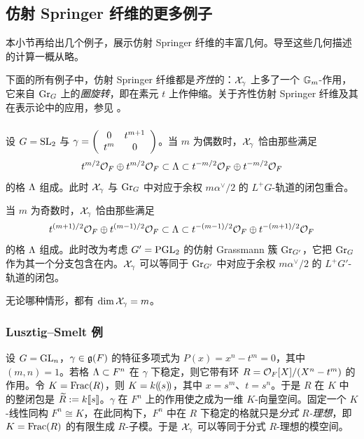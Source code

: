 \subsection{仿射 Springer 纤维的更多例子}\label{ss:aff examples}
本小节再给出几个例子，展示仿射 Springer 纤维的丰富几何。导至这些几何描述的计算一概从略。

下面的所有例子中，仿射 Springer 纤维都是{\em 齐性}的：$\mathcal{X}_{\gamma}$ 上多了一个 $\mathbb{G}_m$-作用，它来自 $\textup{Gr}_{G}$ 上的{\em 圈旋转}，即在素元 $t$ 上作伸缩。关于齐性仿射 Springer 纤维及其在表示论中的应用，参见 \cite{OY}。

\subsubsection{}\label{SL2 ram} 设 $G=\textup{SL}_{2}$ 与 $\gamma=\left(\begin{array}{cc} 0 & t^{m+1} \\ t^{m} & 0 \end{array}\right)$。当 $m$ 为偶数时，$\mathcal{X}_{\gamma}$ 恰由那些满足
\begin{equation*}
t^{m/2}\mathcal{O}_{F}\oplus t^{m/2}\mathcal{O}_{F}\subset\Lambda\subset t^{-m/2}\mathcal{O}_{F}\oplus t^{-m/2}\mathcal{O}_{F}
\end{equation*}
的格 $\Lambda$ 组成。此时 $\mathcal{X}_{\gamma}$ 与 $\textup{Gr}_{G}$ 中对应于余权 $m\alpha^{\vee}/2$ 的 $L^{+}G$-轨道的闭包重合。

当 $m$ 为奇数时，$\mathcal{X}_{\gamma}$ 恰由那些满足
\begin{equation*}
t^{(m+1)/2}\mathcal{O}_{F}\oplus t^{(m-1)/2}\mathcal{O}_{F}\subset\Lambda\subset t^{-(m-1)/2}\mathcal{O}_{F}\oplus t^{-(m+1)/2}\mathcal{O}_{F}
\end{equation*}
的格 $\Lambda$ 组成。此时改为考虑 $G'=\textup{PGL}_{2}$ 的仿射 Grassmann 簇 $\textup{Gr}_{G'}$，它把 $\textup{Gr}_{G}$ 作为其一个分支包含在内。$\mathcal{X}_{\gamma}$ 可以等同于 $\textup{Gr}_{G'}$ 中对应于余权 $m\alpha^{\vee}/2$ 的 $L^{+}G'$-轨道的闭包。

无论哪种情形，都有 $\dim\mathcal{X}_{\gamma}=m$。

\subsubsection{Lusztig--Smelt 例}\label{sss:LS} 设 $G=\textup{GL}_{n}$，$\gamma\in\mathfrak{g}(F)$ 的特征多项式为 $P(x)=x^{n}-t^{m}=0$，其中 $(m,n)=1$。若格 $\Lambda\subset F^{n}$ 在 $\gamma$ 下稳定，则它带有环 $R=\mathcal{O}_{F}[X]/(X^{n}-t^{m})$ 的作用。令 $K=\textup{Frac}(R)$，则 $K= k(\!(s)\!)$，其中 $x=s^{m}$、$t=s^{n}$。于是 $R$ 在 $K$ 中的整闭包是 $\widetilde{R}:=k[\![s]\!]$。$\gamma$ 在 $F^{n}$ 上的作用使之成为一维 $K$-向量空间。固定一个 $K$-线性同构 $F^{n}\cong K$，在此同构下，$F^{n}$ 中在 $R$ 下稳定的格就只是{\em 分式 $R$-理想}，即 $K=\textup{Frac}(R)$ 的有限生成 $R$-子模。于是 $\mathcal{X}_{\gamma}$ 可以等同于分式 $R$-理想的模空间。


